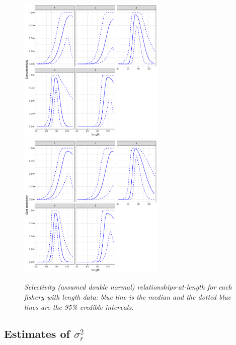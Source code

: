 \documentclass[11pt]{article}
\newcommand{\sigr}{\sigma^2_r}
\begin{document}
\begin{figure}[hb]
    \begin{center}
       \includegraphics[width=7cm,height=7cm]{figs/case4_lengthsel.pdf}\includegraphics[width=7cm,height=7cm]{figs/case4a_lengthsel.pdf} 
    \end{center}
    \caption{\textit{Selectivity (assumed double normal) relationships-at-length for each fishery with
length data: blue line is the median and the dotted blue lines are the 95\% credible intervals.}}
\end{figure}

\subsection{Estimates of $\sigr$}
\end{document}
